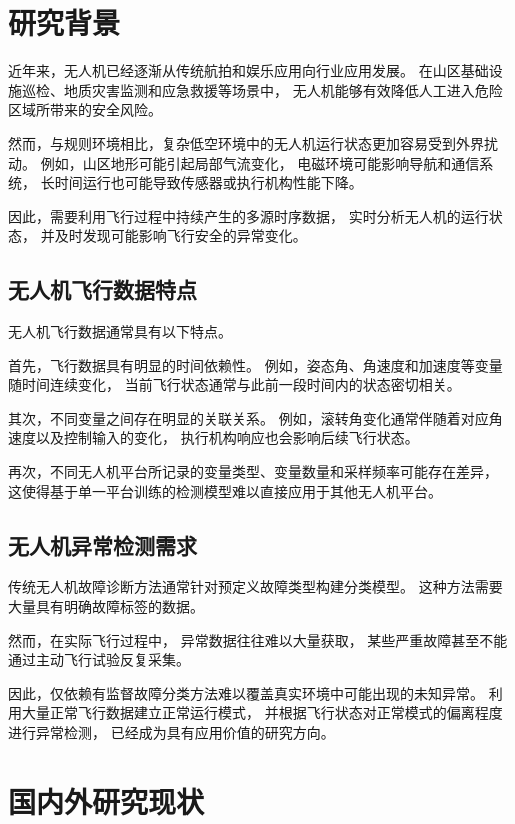 \documentclass[
  degree=master,
  degree-type=academic
]{gzuthesis}
\begin{document}
\section{研究背景}

近年来，无人机已经逐渐从传统航拍和娱乐应用向行业应用发展。
在山区基础设施巡检、地质灾害监测和应急救援等场景中，
无人机能够有效降低人工进入危险区域所带来的安全风险。

然而，与规则环境相比，复杂低空环境中的无人机运行状态更加容易受到外界扰动。
例如，山区地形可能引起局部气流变化，
电磁环境可能影响导航和通信系统，
长时间运行也可能导致传感器或执行机构性能下降。

因此，需要利用飞行过程中持续产生的多源时序数据，
实时分析无人机的运行状态，
并及时发现可能影响飞行安全的异常变化。


\subsection{无人机飞行数据特点}

无人机飞行数据通常具有以下特点。

首先，飞行数据具有明显的时间依赖性。
例如，姿态角、角速度和加速度等变量随时间连续变化，
当前飞行状态通常与此前一段时间内的状态密切相关。

其次，不同变量之间存在明显的关联关系。
例如，滚转角变化通常伴随着对应角速度以及控制输入的变化，
执行机构响应也会影响后续飞行状态。

再次，不同无人机平台所记录的变量类型、变量数量和采样频率可能存在差异，
这使得基于单一平台训练的检测模型难以直接应用于其他无人机平台。


\subsection{无人机异常检测需求}

传统无人机故障诊断方法通常针对预定义故障类型构建分类模型。
这种方法需要大量具有明确故障标签的数据。

然而，在实际飞行过程中，
异常数据往往难以大量获取，
某些严重故障甚至不能通过主动飞行试验反复采集。

因此，仅依赖有监督故障分类方法难以覆盖真实环境中可能出现的未知异常。
利用大量正常飞行数据建立正常运行模式，
并根据飞行状态对正常模式的偏离程度进行异常检测，
已经成为具有应用价值的研究方向。


\section{国内外研究现状}
\end{document}
